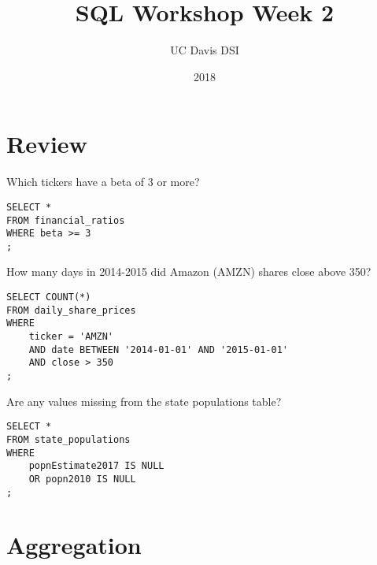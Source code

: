 \documentclass[10pt]{exam}
\begin{document}
 
\title{SQL Workshop Week 2}
\author{UC Davis DSI}
\date{2018}

\maketitle

\section{Review}

\begin{questions}

\question Which tickers have a beta of 3 or more?

\begin{solution}
\begin{lstlisting}
SELECT *
FROM financial_ratios
WHERE beta >= 3
;
\end{lstlisting}
\end{solution}


\question How many days in 2014-2015 did Amazon (AMZN) shares close above 350?

\begin{solution}
\begin{lstlisting}
SELECT COUNT(*)
FROM daily_share_prices
WHERE
	ticker = 'AMZN'
	AND date BETWEEN '2014-01-01' AND '2015-01-01'
	AND close > 350
;
\end{lstlisting}
\end{solution}


\question Are any values missing from the state populations table?

\begin{solution}
\begin{lstlisting}
SELECT *
FROM state_populations
WHERE
	popnEstimate2017 IS NULL
	OR popn2010 IS NULL
;
\end{lstlisting}
\end{solution}


\end{questions}


\clearpage

\section{Aggregation}
\end{document}
